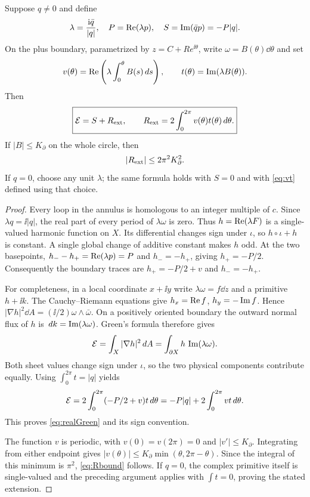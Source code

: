 \begin{theorem}\label{thm:realprimitive}
Suppose $q\ne0$ and define
\begin{equation}\label{eq:lambdaS}
 \lambda=\frac{\mathrm i\bar q}{|q|},\quad
 P=\operatorname{Re}(\lambda p),\quad S=\operatorname{Im}(\bar q p)=-P|q|.
\end{equation}
On the plus boundary, parametrized by $z=C+Re^{\ii\theta}$, write
$\omega=B(\theta)\dd\theta$ and set
\begin{equation}\label{eq:vt}
 v(\theta)=\operatorname{Re}\left(\lambda\int_0^\theta B(s)\,d s\right),
 \qquad t(\theta)=\operatorname{Im}(\lambda B(\theta)).
\end{equation}
Then
\begin{equation}\label{eq:realGreen}
 \boxed{\mathcal E=S+R_{\mathrm{ext}},\qquad
 R_{\mathrm{ext}}=2\int_0^{2\pi}v(\theta)t(\theta)\,d\theta.}
\end{equation}
If $|B|\le K_\partial$ on the whole circle, then
\begin{equation}\label{eq:Rbound}
 |R_{\mathrm{ext}}|\le2\pi^2K_\partial^2.
\end{equation}
If $q=0$, choose any unit $\lambda$; the same formula holds with
$S=0$ and with \eqref{eq:vt} defined using that choice.
\end{theorem}
\begin{proof}
Every loop in the annulus is homologous to an integer multiple of $c$.
Since $\lambda q=\ii|q|$, the real part of every period of
$\lambda\omega$ is zero. Thus
$h=\operatorname{Re}(\lambda F)$ is a single-valued harmonic function on $X$.
Its differential changes sign under $\iota$, so $h\circ\iota+h$ is
constant. A single global change of additive constant makes $h$ odd.
At the two basepoints,
$h_--h_+=\operatorname{Re}(\lambda p)=P$ and $h_-=-h_+$, giving $h_+=-P/2$.
Consequently the boundary traces are $h_+=-P/2+v$ and $h_-=-h_+$.

For completeness, in a local coordinate $x+\ii y$ write
$\lambda\omega=f\dd z$ and a primitive $h+\ii k$. The Cauchy--Riemann
equations give $h_x=\operatorname{Re} f$, $h_y=-\operatorname{Im} f$. Hence
$|\nabla h|^2\dd A=(\ii/2)\omega\wedge\bar\omega$.
On a positively oriented boundary the outward normal flux of $h$
is $\,d k=\operatorname{Im}(\lambda\omega)$. Green's formula therefore gives
\[
 \mathcal E=\int_X|\nabla h|^2\,d A
       =\int_{\partial X}h\,\operatorname{Im}(\lambda\omega).
\]
Both sheet values change sign under $\iota$, so the two physical
components contribute equally. Using $\int_0^{2\pi}t=|q|$ yields
\[
 \mathcal E=2\int_0^{2\pi}(-P/2+v)t\,d\theta
      =-P|q|+2\int_0^{2\pi}vt\,d\theta.
\]
This proves \eqref{eq:realGreen} and its sign convention.

The function $v$ is periodic, with $v(0)=v(2\pi)=0$ and
$|v'|\le K_\partial$. Integrating from either endpoint gives
$|v(\theta)|\le K_\partial\min(\theta,2\pi-\theta)$.
Since the integral of this minimum is $\pi^2$, \eqref{eq:Rbound} follows.
If $q=0$, the complex primitive itself is single-valued and the preceding
argument applies with $\int t=0$, proving the stated extension.
\end{proof}

